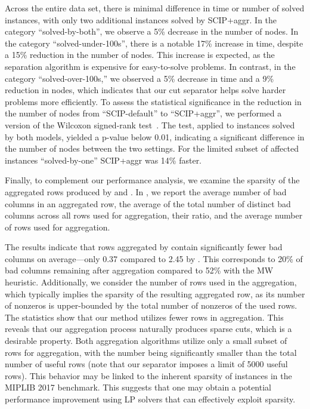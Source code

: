 \documentclass[a4paper,UKenglish,cleveref, autoref,  thm-restate]{lipics-v2021}
\begin{document}
	
	Across the entire data set, there is minimal difference in time or number of solved instances, with only two additional instances solved by SCIP+aggr. In the category ``solved-by-both'', we observe a 5\% decrease in the number of nodes.
	In the category ``solved-under-100s'', there is a notable 17\% increase in time, despite a 15\% reduction in the number of nodes. This increase is expected, as the separation algorithm is expensive for easy-to-solve problems. In contrast, in the category ``solved-over-100s,'' we observed a 5\% decrease in time and a 9\% reduction in nodes, which indicates that our cut separator helps solve harder problems more efficiently.
	To assess the statistical significance in the reduction in the number of nodes from ``SCIP-default'' to ``SCIP+aggr'', we performed a version of the Wilcoxon signed-rank test~\cite{berthold2015heuristic}. The test, applied to instances solved by both models, yielded a p-value below 0.01, indicating a significant difference in the number of nodes between the two settings.
	For the limited subset of affected instances ``solved-by-one'' SCIP+aggr was 14\% faster.
	
	
	Finally, to complement our performance analysis, we examine the sparsity of the aggregated rows produced by  and . In , we report the average number of bad columns in an aggregated row, the average of the total number of distinct bad columns across all rows used for aggregation, their ratio, and the average number of rows used for aggregation.
	
	
	The results indicate that rows aggregated by  contain significantly fewer bad columns on average—only 0.37 compared to 2.45 by .
	This corresponds to 20\% of bad columns remaining after aggregation compared to 52\% with the MW heuristic.
	Additionally, we consider the number of rows used in the aggregation, which typically implies the sparsity of the resulting aggregated row, as its number of nonzeros is upper-bounded by the total number of nonzeros of the used rows. The statistics show that our method utilizes fewer rows in aggregation. This reveals that our aggregation process naturally produces sparse cuts, which is a desirable property.
	Both aggregation algorithms utilize only a small subset of rows for aggregation, with the number  being significantly smaller than the total number of useful rows (note that our separator imposes a limit of 5000 useful rows). This behavior may be linked to the inherent sparsity of instances in the MIPLIB 2017 benchmark. This suggests that one may obtain a potential performance improvement using LP solvers that can effectively exploit sparsity.
	
\end{document}
